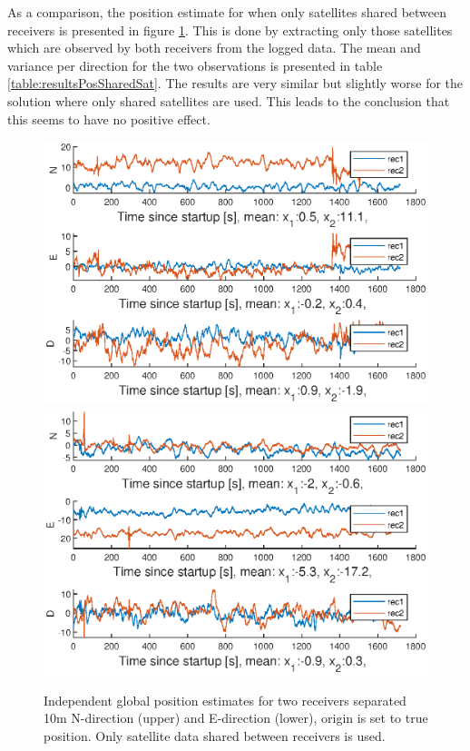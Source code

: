 As a comparison, the position estimate for when only satellites shared  between receivers is presented in figure \ref{fig:globalPosSelectSV}. This is done by extracting only those satellites which are observed by both receivers from the logged data. The mean and variance per direction for the two observations is presented in table \ref{table:resultsPosSharedSat}. The results are very similar but slightly worse for the solution where only shared satellites are used. This leads to the conclusion that this seems to have no positive effect.

\begin{figure}[H]
\includegraphics[width=1\textwidth]{Results/DistNED30MinNSharedSat}
\includegraphics[width=1\textwidth]{Results/DistNED30MinESharedSats}
\caption{\label{fig:globalPosSelectSV} Independent global position estimates for two receivers separated 10m N-direction (upper) and E-direction (lower), origin is set to true position. Only satellite data shared between receivers is used.}
\end{figure}
